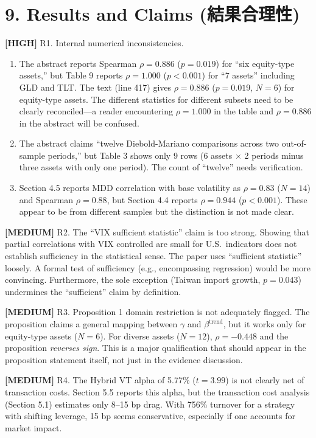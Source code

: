 \documentclass[12pt,a4paper]{article}
\newcommand{\high}[1]{\textcolor{errorred}{\textbf{[HIGH]} #1}}
\newcommand{\med}[1]{\textcolor{warncolor}{\textbf{[MEDIUM]} #1}}
\begin{document}
\section*{9. Results and Claims (結果合理性)}

\high{R1. Internal numerical inconsistencies.}
\begin{enumerate}[nosep]
\item The abstract reports Spearman $\rho = 0.886$ ($p = 0.019$) for ``six equity-type assets,'' but Table 9 reports $\rho = 1.000$ ($p < 0.001$) for ``7 assets'' including GLD and TLT. The text (line 417) gives $\rho = 0.886$ ($p = 0.019$, $N = 6$) for equity-type assets. The different statistics for different subsets need to be clearly reconciled---a reader encountering $\rho = 1.000$ in the table and $\rho = 0.886$ in the abstract will be confused.
\item The abstract claims ``twelve Diebold-Mariano comparisons across two out-of-sample periods,'' but Table 3 shows only 9 rows (6 assets $\times$ 2 periods minus three assets with only one period). The count of ``twelve'' needs verification.
\item Section 4.5 reports MDD correlation with base volatility as $\rho = 0.83$ ($N = 14$) and Spearman $\rho = 0.88$, but Section 4.4 reports $\rho = 0.944$ ($p < 0.001$). These appear to be from different samples but the distinction is not made clear.
\end{enumerate}

\med{R2. The ``VIX sufficient statistic'' claim is too strong.} Showing that partial correlations with VIX controlled are small for U.S.\ indicators does not establish sufficiency in the statistical sense. The paper uses ``sufficient statistic'' loosely. A formal test of sufficiency (e.g., encompassing regression) would be more convincing. Furthermore, the sole exception (Taiwan import growth, $p = 0.043$) undermines the ``sufficient'' claim by definition.

\med{R3. Proposition 1 domain restriction is not adequately flagged.} The proposition claims a general mapping between $\gamma$ and $\beta^{\text{trend}}$, but it works only for equity-type assets ($N = 6$). For diverse assets ($N = 12$), $\rho = -0.448$ and the proposition \emph{reverses sign}. This is a major qualification that should appear in the proposition statement itself, not just in the evidence discussion.

\med{R4. The Hybrid VT alpha of 5.77\% ($t = 3.99$) is not clearly net of transaction costs.} Section 5.5 reports this alpha, but the transaction cost analysis (Section 5.1) estimates only 8--15 bp drag. With 756\% turnover for a strategy with shifting leverage, 15 bp seems conservative, especially if one accounts for market impact.
\end{document}
